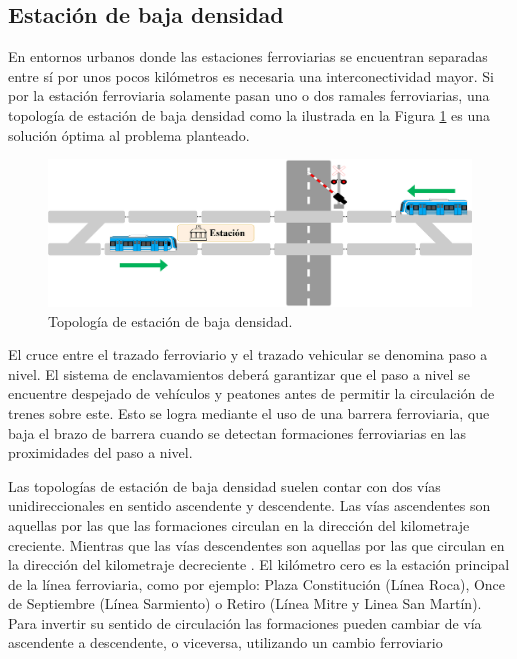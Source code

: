 \subsection{Estación de baja densidad}


En entornos urbanos donde las estaciones ferroviarias se encuentran separadas entre sí por unos pocos kilómetros es necesaria una interconectividad mayor. Si por la estación ferroviaria solamente pasan uno o dos ramales ferroviarias, una topología de estación de baja densidad como la ilustrada en la Figura \ref{fig:simple_1} es una solución óptima al problema planteado.

    \begin{figure}[H]
        \centering
        \includegraphics[width=1\textwidth]{Figuras/bajaDensidad}
        \centering\caption{Topología de estación de baja densidad.}
        \label{fig:simple_1}
    \end{figure}

El cruce entre el trazado ferroviario y el trazado vehicular se denomina paso a nivel. El sistema de enclavamientos deberá garantizar que el paso a nivel se encuentre despejado de vehículos y peatones antes de permitir la circulación de trenes sobre este. Esto se logra mediante el uso de una barrera ferroviaria, que baja el brazo de barrera cuando se detectan formaciones ferroviarias en las proximidades del paso a nivel.

Las topologías de estación de baja densidad suelen contar con dos vías unidireccionales en sentido ascendente y descendente. 
Las vías ascendentes son aquellas por las que las formaciones circulan en la dirección del kilometraje creciente. Mientras que las vías descendentes son aquellas por las que circulan en la dirección del kilometraje decreciente \cite{RITO}. El kilómetro cero es la estación principal de la línea ferroviaria, como por ejemplo: Plaza Constitución (Línea Roca), Once de Septiembre (Línea Sarmiento) o Retiro (Línea Mitre y Linea San Martín). Para invertir su sentido de circulación las formaciones pueden cambiar de vía
ascendente a descendente, o viceversa, utilizando un cambio ferroviario